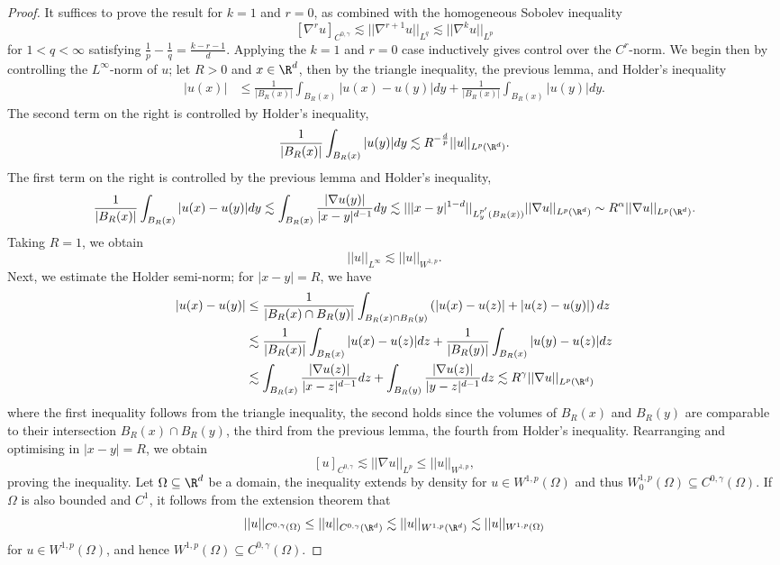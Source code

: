 \documentclass[reqno]{amsart}
\theoremstyle{definition}
\theoremstyle{remark}
\begin{document}
\begin{proof}
	It suffices to prove the result for $k = 1$ and $r = 0$, as combined with the homogeneous Sobolev inequality 
		\[ [\nabla^r u]_{C^{0, \gamma}} \lesssim ||\nabla^{r + 1} u||_{L^q} \lesssim ||\nabla^k u||_{L^p} \]
	for $1 < q < \infty$ satisfying $\tfrac{1}{p} - \tfrac{1}{q}= \tfrac{k - r - 1}{d}$. Applying the $k = 1$ and $r = 0$ case inductively gives control over the $C^r$-norm. We begin then by controlling the $L^\infty$-norm of $u$; let $R > 0$ and $x \in \R^d$, then by the triangle inequality, the previous lemma, and Holder's inequality
		\begin{align*}
			 |u(x)|
			 	&\leq \frac{1}{|B_R (x)|} \int_{B_R (x)} |u(x) - u(y)| dy + \frac{1}{|B_R (x)|} \int_{B_R (x)} |u(y)| dy .
		\end{align*}	 	
	The second term on the right is controlled by Holder's inequality,
		\[ \frac{1}{|B_R (x)|} \int_{B_R (x)} |u(y)| dy \lesssim R^{- \frac{d}{p}} ||u||_{L^p (\R^d)} .\]	
	The first term on the right is controlled by the previous lemma and Holder's inequality, 
		\begin{align*}
			\frac{1}{|B_R (x)|} \int_{B_R (x)} |u(x) - u(y)| dy \lesssim \int_{B_R (x)} \frac{|\nabla u (y)|}{|x - y|^{d  - 1}} dy \lesssim || |x - y|^{1 - d} ||_{L^{p'}_y (B_R (x))} ||\nabla u||_{L^p (\R^d)} \sim R^\alpha ||\nabla u||_{L^p (\R^d)}.
		\end{align*}
	Taking $R = 1$, we obtain 
		\[ ||u||_{L^\infty} \lesssim ||u||_{W^{1, p}}.  \]
	Next, we estimate the Holder semi-norm; for $|x - y| = R$, we have
		\begin{align*}
			 |u(x) -u(y)| 
			 	&\leq \frac{1}{|B_R (x) \cap B_R (y)|} \int_{B_R (x) \cap B_R (y)} \left( |u(x) - u(z)| + |u(z) - u(y)| \right) dz \\
			 	&\lesssim \frac{1}{|B_R (x)|} \int_{B_R (x)} |u(x) - u(z)| dz + \frac{1}{|B_R (y)|} \int_{B_R (x)} |u(y) - u(z)| dz \\
			 	&\lesssim \int_{B_R (x)} \frac{|\nabla u(z)|}{|x - z|^{d - 1}} dz + \int_{B_R (y)} \frac{|\nabla u(z)|}{|y - z|^{d - 1}} dz \lesssim R^\gamma ||\nabla u||_{L^p (\R^d)}
		\end{align*}	 	
	where the first inequality follows from the triangle inequality, the second holds since the volumes of $B_R (x)$ and $B_R(y)$ are comparable to their intersection $B_R (x) \cap B_R (y)$, the third from the previous lemma, the fourth from Holder's inequality. Rearranging and optimising in $|x - y| = R$, we obtain
		\[ [u]_{C^{0, \gamma}} \lesssim ||\nabla u||_{L^p} \leq ||u||_{W^{1, p}}, \]
	proving the inequality. Let $\Omega \subseteq \R^d$ be a domain, the inequality extends by density for $u \in W^{1, p} (\Omega)$ and thus $W^{1, p}_0 (\Omega) \subseteq C^{0, \gamma} (\Omega)$. If $\Omega$ is also bounded and $C^1$, it follows from the extension theorem that
		\[ ||u||_{C^{0, \gamma} (\Omega)} \leq ||u||_{C^{0, \gamma} (\R^d)} \lesssim ||u||_{W^{1, p} (\R^d)} \lesssim ||u||_{W^{1,p} (\Omega)} \]
	for $u \in W^{1, p} (\Omega)$, and hence $W^{1, p} (\Omega) \subseteq C^{0, \gamma} (\Omega)$. 	
\end{proof}
\end{document}
